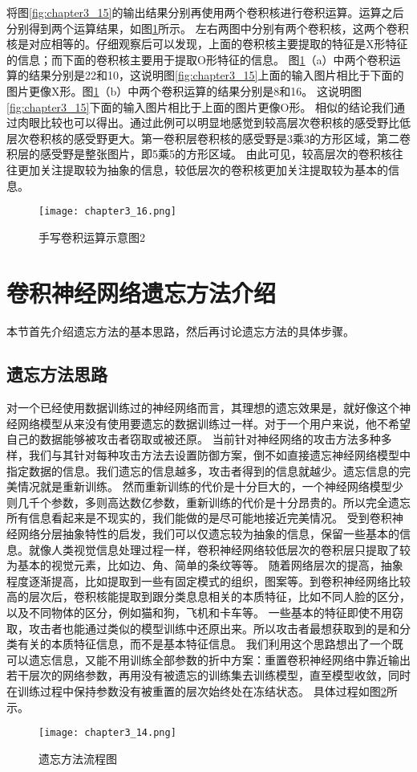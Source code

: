 将图\ref{fig:chapter3_15}的输出结果分别再使用两个卷积核进行卷积运算。运算之后分别得到两个运算结果，如图\ref{fig:chapter3_16}所示。
左右两图中分别有两个卷积核，这两个卷积核是对应相等的。仔细观察后可以发现，上面的卷积核主要提取的特征是X形特征的信息；而下面的卷积核主要用于提取O形特征的信息。
图\ref{fig:chapter3_16}（a）中两个卷积运算的结果分别是22和10，这说明图\ref{fig:chapter3_15}上面的输入图片相比于下面的图片更像X形。图\ref{fig:chapter3_16}（b）中两个卷积运算的结果分别是8和16。
这说明图\ref{fig:chapter3_15}下面的输入图片相比于上面的图片更像O形。
相似的结论我们通过肉眼比较也可以得出。通过此例可以明显地感觉到较高层次卷积核的感受野比低层次卷积核的感受野更大。第一卷积层卷积核的感受野是3乘3的方形区域，第二卷积层的感受野是整张图片，即5乘5的方形区域。
由此可见，较高层次的卷积核往往更加关注提取较为抽象的信息，较低层次的卷积核更加关注提取较为基本的信息。
\begin{figure}
    \centering
    \texttt{[image: chapter3\_16.png]}
    \caption{手写卷积运算示意图2}
    \label{fig:chapter3_16}
\end{figure}

\section{卷积神经网络遗忘方法介绍}
本节首先介绍遗忘方法的基本思路，然后再讨论遗忘方法的具体步骤。
\subsection{遗忘方法思路}
对一个已经使用数据训练过的神经网络而言，其理想的遗忘效果是，就好像这个神经网络模型从来没有使用要遗忘的数据训练过一样。对于一个用户来说，他不希望自己的数据能够被攻击者窃取或被还原。
当前针对神经网络的攻击方法多种多样，我们与其针对每种攻击方法去设置防御方案，倒不如直接遗忘神经网络模型中指定数据的信息。我们遗忘的信息越多，攻击者得到的信息就越少。遗忘信息的完美情况就是重新训练。
然而重新训练的代价是十分巨大的，一个神经网络模型少则几千个参数，多则高达数亿参数，重新训练的代价是十分昂贵的。所以完全遗忘所有信息看起来是不现实的，我们能做的是尽可能地接近完美情况。
受到卷积神经网络分层抽象特性的启发，我们可以仅遗忘较为抽象的信息，保留一些基本的信息。就像人类视觉信息处理过程一样，卷积神经网络较低层次的卷积层只提取了较为基本的视觉元素，比如边、角、简单的条纹等等。
随着网络层次的提高，抽象程度逐渐提高，比如提取到一些有固定模式的组织，图案等。到卷积神经网络比较高的层次后，卷积核能提取到跟分类息息相关的本质特征，比如不同人脸的区分，以及不同物体的区分，例如猫和狗，飞机和卡车等。
一些基本的特征即使不用窃取，攻击者也能通过类似的模型训练中还原出来。所以攻击者最想获取到的是和分类有关的本质特征信息，而不是基本特征信息。
我们利用这个思路想出了一个既可以遗忘信息，又能不用训练全部参数的折中方案：重置卷积神经网络中靠近输出若干层次的网络参数，再用没有被遗忘的训练集去训练模型，直至模型收敛，同时在训练过程中保持参数没有被重置的层次始终处在冻结状态。
具体过程如图\ref{fig:chapter3_14}所示。
\begin{figure}
    \centering
    \texttt{[image: chapter3\_14.png]}
    \caption{遗忘方法流程图}
    \label{fig:chapter3_14}
\end{figure}

